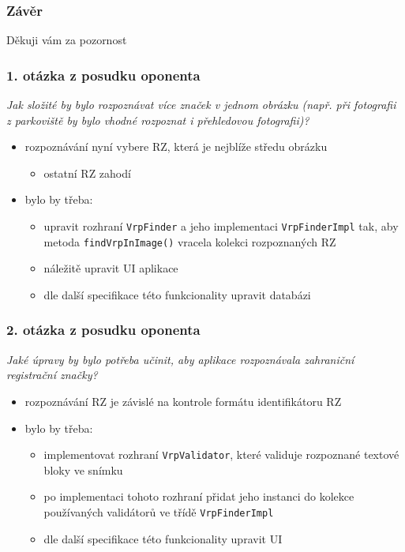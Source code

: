 \documentclass{beamer}
\begin{document}
\begin{frame}
\frametitle{Závěr}
    \fontsize{14pt}{12pt}\selectfont
    \centering
    Děkuji vám za pozornost
\end{frame}


\begin{frame}
\frametitle{1. otázka z posudku oponenta}
    \begingroup
    \fontsize{11pt}{12pt}\selectfont
    \textit{Jak složité by bylo rozpoznávat více značek v jednom obrázku (např. při fotografii z parkoviště by bylo
vhodné rozpoznat i přehledovou fotografii)?}
    \endgroup
    \bigskip
    \begin{itemize}
        \item rozpoznávání nyní vybere RZ, která je nejblíže středu obrázku
            \begin{itemize}
                \item ostatní RZ zahodí
            \end{itemize}
        \item bylo by třeba:
        \begin{itemize}
            \item upravit rozhraní \texttt{VrpFinder} a jeho implementaci \texttt{VrpFinderImpl} tak, aby metoda \texttt{findVrpInImage()} vracela kolekci rozpoznaných RZ
            
            \item náležitě upravit UI aplikace

            \item dle další specifikace této funkcionality upravit databázi
        \end{itemize}
    \end{itemize}
\end{frame}

\begin{frame}

\frametitle{2. otázka z posudku oponenta}
    \begingroup
    \fontsize{11pt}{12pt}\selectfont
    \textit{Jaké úpravy by bylo potřeba učinit, aby aplikace rozpoznávala zahraniční registrační značky?}
    \endgroup
    \bigskip
    \begin{itemize}
        \item rozpoznávání RZ je závislé na kontrole formátu identifikátoru RZ 
        \item bylo by třeba:
        \begin{itemize}
            \item implementovat rozhraní \texttt{VrpValidator}, které validuje rozpoznané textové bloky ve snímku  
            \item po implementaci tohoto rozhraní přidat jeho instanci do kolekce používaných validátorů ve třídě \texttt{VrpFinderImpl}

            \item dle další specifikace této funkcionality upravit UI
        \end{itemize}
    \end{itemize}
\end{frame}
\end{document}
